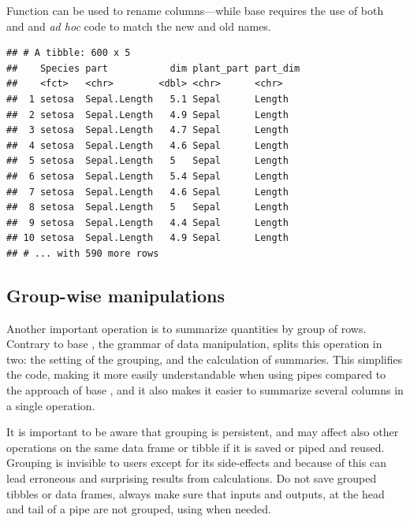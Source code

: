 \documentclass[krantz2]{krantz}\usepackage{knitr}%
\begin{document}
Function  can be used to rename columns---while base \Rlang requires the use of both  and  and \emph{ad hoc} code to match the new and old names.

\begin{knitrout}\footnotesize
{}\color{fgcolor}\begin{kframe}
\begin{alltt}
  
\end{alltt}
\begin{verbatim}
## # A tibble: 600 x 5
##    Species part           dim plant_part part_dim
##    <fct>   <chr>        <dbl> <chr>      <chr>   
##  1 setosa  Sepal.Length   5.1 Sepal      Length  
##  2 setosa  Sepal.Length   4.9 Sepal      Length  
##  3 setosa  Sepal.Length   4.7 Sepal      Length  
##  4 setosa  Sepal.Length   4.6 Sepal      Length  
##  5 setosa  Sepal.Length   5   Sepal      Length  
##  6 setosa  Sepal.Length   5.4 Sepal      Length  
##  7 setosa  Sepal.Length   4.6 Sepal      Length  
##  8 setosa  Sepal.Length   5   Sepal      Length  
##  9 setosa  Sepal.Length   4.4 Sepal      Length  
## 10 setosa  Sepal.Length   4.9 Sepal      Length  
## # ... with 590 more rows
\end{verbatim}
\end{kframe}
\end{knitrout}

\subsection{Group-wise manipulations}

Another important operation is to summarize quantities by group of rows. Contrary to base \Rlang, the grammar of data manipulation, splits this operation in two: the setting of the grouping, and the calculation of summaries. This simplifies the code, making it more easily understandable when using pipes compared to the approach of base \Rlang {}, and it also makes it easier to summarize several columns in a single operation.

\begin{warningbox}
It is important to be aware that grouping is persistent, and may affect also other operations on the same data frame or tibble if it is saved or piped and reused. Grouping is invisible to users except for its side-effects and because of this can lead erroneous and surprising results from calculations. Do not save grouped tibbles or data frames, always make sure that inputs and outputs, at the head and tail of a pipe are not grouped, using  when needed.
\end{warningbox}
\end{document}
